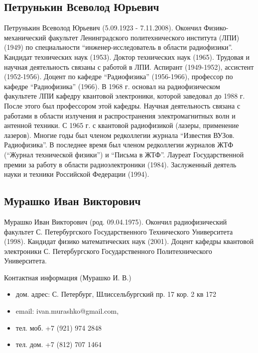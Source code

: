 \subsection{Петрунькин Всеволод Юрьевич}
Петрунькин Всеволод Юрьевич (5.09.1923 - 7.11.2008). Окончил
Физико-механический факультет Ленинградского политехнического
института (ЛПИ) (1949) по специальности ``инженер-исследователь в
области радиофизики''. Кандидат технических наук (1953). Доктор
технических наук (1965). Трудовая и научная деятельность связаны с
работой в ЛПИ. Аспирант (1949-1952), ассистент (1952-1956). Доцент по
кафедре ``Радиофизика'' (1956-1966), профессор по кафедре ``Радиофизика''
(1966). В 1968 г. основал на радиофизическом факультете ЛПИ кафедру
квантовой электроники, которой заведовал до 1988 г. После этого был
профессором этой кафедры. Научная деятельность связана с работами в
области излучения и распространения электромагнитных волн и антенной
техники. С 1965 г. с квантовой радиофизикой (лазеры, применение
лазеров). Многие годы был членом редколлегии журнала ``Известия
ВУЗов. Радиофизика''. В последнее время был членом редколлегии
журналов ЖТФ (``Журнал технической физики'') и ``Письма в
ЖТФ''. Лауреат Государственной премии за работу в области
радиоэлектроники (1984). Заслуженный деятель науки и техники
Российской Федерации (1994). 
\subsection{Мурашко Иван Викторович} 
Мурашко Иван Викторович (род. 09.04.1975). Окончил радиофизический
факультет С. Петербургского Государственного Технического Университета
(1998). Кандидат физико математических наук (2001). Доцент кафедры
квантовой электроники С. Петербургского Государственного
Политехнического Университета.

Контактная информация (Мурашко И. В.) 
\begin{itemize}
\item дом. адрес: С. Петербург, Шлиссельбургский пр. 17 кор. 2 кв 172
\item email: ivan.murashko@gmail.com,
\item тел. моб. +7 (921) 974 2848 
\item тел. дом. +7 (812) 707 1464
\end{itemize}

